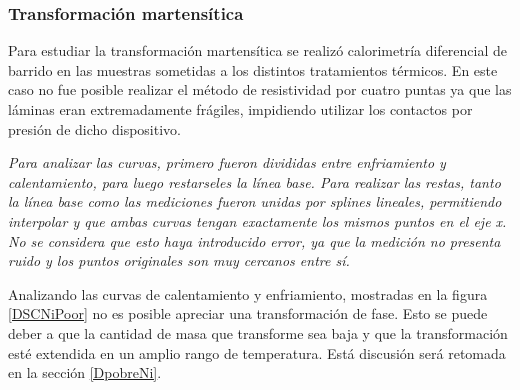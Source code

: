 \documentclass[12pt]{article}
\theoremstyle{definition}
\theoremstyle{remark}
\begin{document}
{\subsubsection{Transformación martensítica}

Para estudiar la transformación martensítica se realizó calorimetría diferencial de barrido en las muestras sometidas a los distintos tratamientos térmicos. En este caso no fue posible realizar el método de resistividad por cuatro puntas ya que las láminas eran extremadamente frágiles, impidiendo utilizar los contactos por presión de dicho dispositivo.

\textit{Para analizar las curvas, primero fueron divididas entre enfriamiento y calentamiento, para luego restarseles la línea base. Para realizar las restas, tanto la línea base como las mediciones fueron unidas por splines lineales, permitiendo interpolar y que ambas curvas tengan exactamente los mismos puntos en el eje x. No se considera que esto haya introducido error, ya que la medición no presenta ruido y los puntos originales son muy cercanos entre sí.}

Analizando las curvas de calentamiento y enfriamiento, mostradas en la figura \ref{DSCNiPoor} no es posible apreciar una transformación de fase. Esto se puede deber a que la cantidad de masa que transforme sea baja y que la transformación esté extendida en un amplio rango de temperatura. Está discusión será retomada en la sección \ref{DpobreNi}.

}
\end{document}

